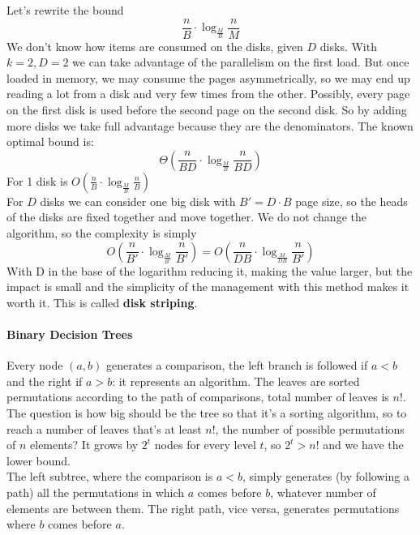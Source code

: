 \documentclass[10pt]{report}
\begin{document}
Let's rewrite the bound
$$\frac{n}{B}\cdot\log_{\frac{M}{B}}\frac{n}{M}$$
We don't know how items are consumed on the disks, given $D$ disks. With $k = 2, D = 2$ we can take advantage of the parallelism on the first load. But once loaded in memory, we may consume the pages asymmetrically, so we may end up reading a lot from a disk and very few times from the other. Possibly, every page on the first disk is used before the second page on the second disk. So by adding more disks we take full advantage because they are the denominators. The known optimal bound is:
$$\Theta\left(\frac{n}{BD}\cdot\log_{\frac{M}{B}}\frac{n}{BD}\right)$$
For 1 disk is $O(\frac{n}{B}\cdot\log_{\frac{M}{B}}\frac{n}{B})$\\
For $D$ disks we can consider one big disk with $B' = D\cdot B$ page size, so the heads of the disks are fixed together and move together. We do not change the algorithm, so the complexity is simply $$O\left(\frac{n}{B'}\cdot\log_{\frac{M}{B'}}\frac{n}{B'}\right) = O\left(\frac{n}{DB}\cdot\log_{\frac{M}{DB}}\frac{n}{B'}\right)$$ With D in the base of the logarithm reducing it, making the value larger, but the impact is small and the simplicity of the management with this method makes it worth it. This is called \textbf{disk striping}.
\paragraph{Binary Decision Trees} Every node $(a,b)$ generates a comparison, the left branch is followed if $a<b$ and the right if $a>b$: it represents an algorithm. The leaves are sorted permutations according to the path of comparisons, total number of leaves is $n!$. The question is how big should be the tree so that it's a sorting algorithm, so to reach a number of leaves that's at least $n!$, the number of possible permutations of $n$ elements? It grows by $2^t$ nodes for every level $t$, so $2^t > n!$ and we have the lower bound.\\
The left subtree, where the comparison is $a < b$, simply generates (by following a path) all the permutations in which $a$ comes before $b$, whatever number of elements are between them. The right path, vice versa, generates permutations where $b$ comes before $a$.
\end{document}
